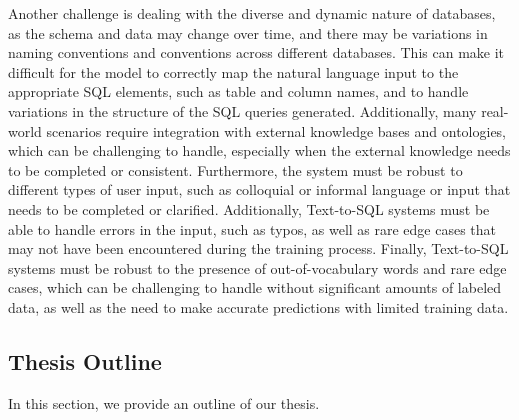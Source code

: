 Another challenge is dealing with the diverse and dynamic nature of databases, as the schema and data may change over time, and there may be variations in naming conventions and conventions across different databases. This can make it difficult for the model to correctly map the natural language input to the appropriate SQL elements, such as table and column names, and to handle variations in the structure of the SQL queries generated. Additionally, many real-world scenarios require integration with external knowledge bases and ontologies, which can be challenging to handle, especially when the external knowledge needs to be completed or consistent. Furthermore, the system must be robust to different types of user input, such as colloquial or informal language or input that needs to be completed or clarified. Additionally, Text-to-SQL systems must be able to handle errors in the input, such as typos, as well as rare edge cases that may not have been encountered during the training process. Finally, Text-to-SQL systems must be robust to the presence of out-of-vocabulary words and rare edge cases, which can be challenging to handle without significant amounts of labeled data, as well as the need to make accurate predictions with limited training data.

\clearpage
\subsection{Thesis Outline}

In this section, we provide an outline of our thesis.

